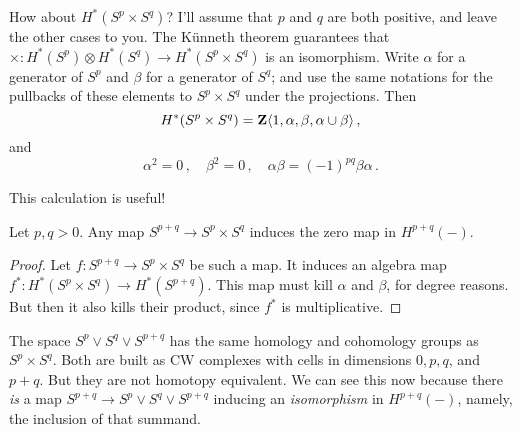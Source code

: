\begin{example}
How about $H^\ast(S^p\times S^q)$? I'll assume that $p$ and $q$ are both
positive, and leave the other cases to you. The K\"unneth theorem guarantees
that $\times:H^*(S^p)\otimes H^*(S^q)\to H^*(S^p\times S^q)$ is an isomorphism.
Write $\alpha$ for a generator of $S^p$ and $\beta$ for a generator of 
$S^q$; and use the same notations for the pullbacks of these elements to
$S^p\times S^q$ under the projections. Then 
\[
H^*(S^p\times S^q)=\mathbf Z\langle1,\alpha,\beta,\alpha\cup\beta\rangle\,,
\]
and
\[
\alpha^2=0\,,\quad\beta^2=0\,,\quad\alpha\beta=(-1)^{pq}\beta\alpha\,.
\]

This calculation is useful!
\begin{corollary} Let $p,q>0$.
Any map $S^{p+q}\to S^p\times S^q$ induces the zero map in $H^{p+q}(-)$. 
\end{corollary}
\begin{proof}
Let $f:S^{p+q}\to S^p\times S^q$ be such a map. It induces an algebra map
$f^*:H^*(S^p\times S^q)\to H^*(S^{p+q})$. This map must kill $\alpha$ and
$\beta$, for degree reasons. But then it also kills their product, since
$f^*$ is multiplicative. 
\end{proof}
The space $S^p\vee S^q\vee S^{p+q}$ has the same homology and 
cohomology groups as
$S^p\times S^q$. Both are built as CW complexes with cells in dimensions
$0, p, q$, and $p+q$. But they are not homotopy equivalent. We can see this
now because there {\em is} a map $S^{p+q}\to S^p\vee S^q\vee S^{p+q}$
inducing an {\em isomorphism} in $H^{p+q}(-)$, namely, the inclusion
of that summand.
\end{example}
